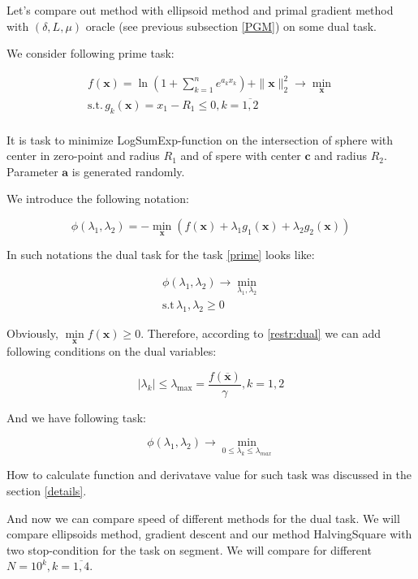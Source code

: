 \documentclass[12pt]{article}
\begin{document}
Let's compare out method with ellipsoid method and primal gradient method with $(\delta, L,\mu)$ oracle (see previous subsection \ref{PGM}) on some dual task.

We consider following prime task:

\begin{gather}
\label{prime}
f(\textbf{x}) = \ln \left(1+\sum_{k=1}^ne^{a_kx_k}\right) + \|\textbf{x}\|_2^2\rightarrow \min\limits_{\textbf{x}}\\
\text{s.t.}\,g_k(\textbf{x}) = x_1-R_1\leq0, k = \overline{1,2}\\
\end{gather}

It is task to minimize LogSumExp-function on the intersection of sphere with center in zero-point and radius $R_1$ and of spere with center $\textbf{c}$ and radius $R_2$. Parameter $\textbf{a}$ is generated randomly.

We introduce the following notation:

\begin{equation}
\label{phi}
\phi(\lambda_1, \lambda_2) = -\min\limits_{\textbf{x}}\left(f(\textbf{x}) +\lambda_1 g_1(\textbf{x}) +\lambda_2g_2(\textbf{x})\right)
\end{equation}

In such notations the dual task for the task \ref{prime} looks like:

\begin{gather}
\phi(\lambda_1, \lambda_2) \rightarrow \min\limits_{\lambda_1, \lambda_2}\\
\text{s.t}\, \lambda_1, \lambda_2 \geq 0
\end{gather}
 
Obviously, $\min\limits_{\textbf{x}}f(\textbf{x}) \geq 0$. Therefore, according to \ref{restr:dual} we can add following conditions on the dual variables:

$$|\lambda_k| \leq \lambda_{\text{max}}=\frac{f(\overline{\textbf{x}})}{\gamma}, k=1,2$$

And we have following task:

$$\phi(\lambda_1, \lambda_2) \rightarrow \min_{0\leq\lambda_k\leq\lambda_{max}}$$

How to calculate function and derivatave value for such task was discussed in the section \ref{details}.

And now we can compare speed of different methods for the dual task. We will compare ellipsoids method, gradient descent and our method HalvingSquare with two stop-condition for the task on segment. We will compare for different $N = 10^k, k = \overline{1, 4}$.
\end{document}
